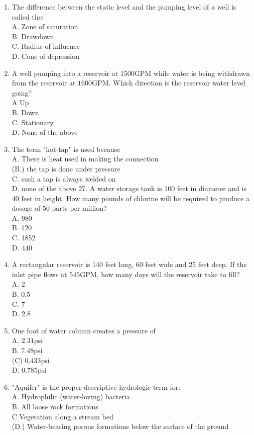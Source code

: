 \documentclass[10pt]{article}
\begin{document}
\begin{enumerate}
  \item The difference between the static level and the pumping level of a well is called the:\\
A. Zone of saturation\\
B. Drawdown\\
C. Radius of influence\\
D. Cone of depression

  \item A well pumping into a reservoir at $1500 \mathrm{GPM}$ while water is being withdrawn from the reservoir at $1600 \mathrm{GPM}$. Which direction is the reservoir water level going?\\
A Up\\
B. Down\\
C. Stationary\\
D. None of the above

  \item The term "hot-tap" is used because\\
A. There is heat used in making the connection\\
(B.) the tap is done under pressure\\
C. such a tap is always welded on\\
D. none of the above 27. A water storage tank is 100 feet in diameter and is 40 feet in height. How many pounds of chlorine will be required to produce a dosage of 50 parts per million?\\
A. 980\\
B. 120\\
C. 1852\\
D. 440

  \item A rectangular reservoir is 140 feet long, 60 feet wide and 25 feet deep. If the inlet pipe flows at $545 \mathrm{GPM}$, how many days will the reservoir take to fill?\\
A. 2\\
B. $0.5$\\
C. 7\\
D. $2.8$

  \item One foot of water column creates a pressure of\\
A. $2.31 \mathrm{psi}$\\
B. $7.48 \mathrm{psi}$\\
(C) $0.433 \mathrm{psi}$\\
D. $0.785 \mathrm{psi}$

  \item "Aquifer" is the proper descriptive hydrologic term for:\\
A. Hydrophilic (water-loving) bacteria\\
B. All loose rock formations\\
C Vegetation along a stream bed\\
(D.) Water-bearing porous formations below the surface of the ground


\end{enumerate}
\end{document}
